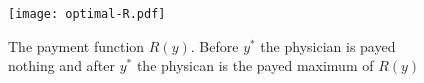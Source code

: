 \begin{figure}[htbp]
    \centering
    \texttt{[image: optimal-R.pdf]}
    \caption{The payment function $R(y)$. Before $y^*$ the physician is payed nothing and after $y^*$ the physican is the payed maximum of $R(y)$ }
    \label{fig:label}
\end{figure}







